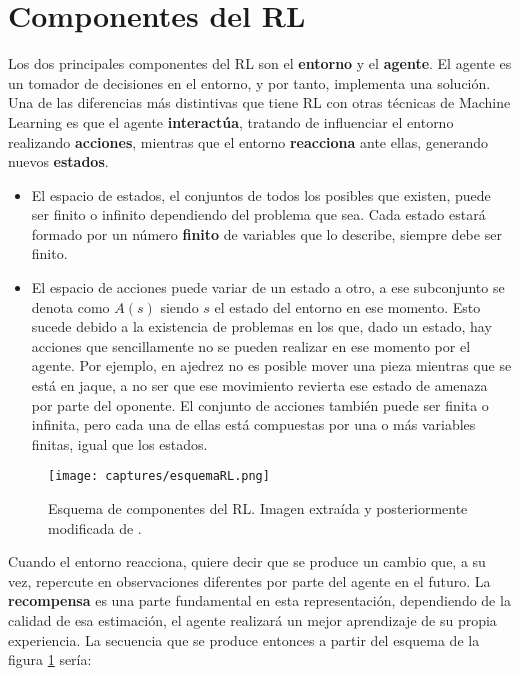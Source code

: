 \documentclass[11pt,fleqn]{book} %
\begin{document}
\section{Componentes del RL}\label{sec:componentesRL}

Los dos principales componentes del RL son el \textbf{entorno} y el \textbf{agente}. El agente es un tomador de decisiones en el entorno, y por tanto, implementa una solución. Una de las diferencias más distintivas que tiene RL con otras técnicas de Machine Learning es que el agente \textbf{interactúa}, tratando de influenciar el entorno realizando \textbf{acciones}, mientras que el entorno \textbf{reacciona} ante ellas, generando nuevos \textbf{estados}. \\

\begin{itemize}
	\item El espacio de estados, el conjuntos de todos los posibles que existen, puede ser finito o infinito dependiendo del problema que sea. Cada estado estará formado por un número \textbf{finito} de variables que lo describe, siempre debe ser finito. \\
	
	\item El espacio de acciones puede variar de un estado a otro, a ese subconjunto se denota como $A(s)$ siendo $s$ el estado del entorno en ese momento. Esto sucede debido a la existencia de problemas en los que, dado un estado, hay acciones que sencillamente no se pueden realizar en ese momento por el agente. Por ejemplo, en ajedrez no es posible mover una pieza mientras que se está en jaque, a no ser que ese movimiento revierta ese estado de amenaza por parte del oponente. El conjunto de acciones también puede ser finita o infinita, pero cada una de ellas está compuestas por una o más variables finitas, igual que los estados.
\end{itemize}

\begin{figure}[H]
	\centering\texttt{[image: captures/esquemaRL.png]}
	\caption{Esquema de componentes del RL. Imagen extraída y posteriormente modificada de \cite{article:RLwikipedia}.}
	\label{fig:esquemaRL} %
\end{figure}

Cuando el entorno reacciona, quiere decir que se produce un cambio que, a su vez, repercute en observaciones diferentes por parte del agente en el futuro. La \textbf{recompensa} es una parte fundamental en esta representación, dependiendo de la calidad de esa estimación, el agente realizará un mejor aprendizaje de su propia experiencia. La secuencia que se produce entonces a partir del esquema de la figura \ref{fig:esquemaRL} sería:
\end{document}
